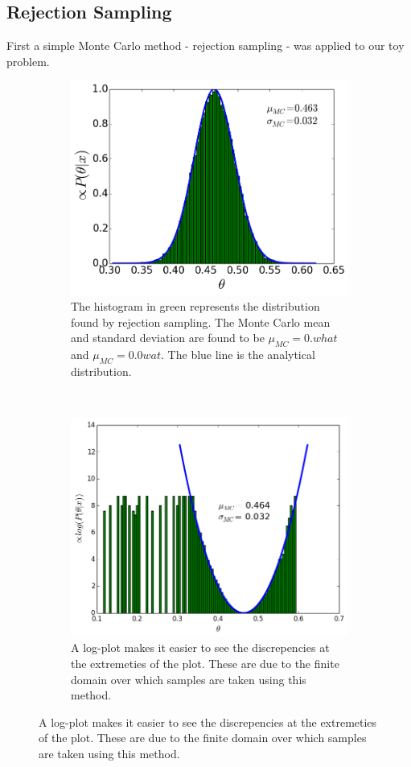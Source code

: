 \documentclass[a4paper,11pt,twoside]{article}
\begin{document}
\subsection{Rejection Sampling} 
First a simple Monte Carlo method - rejection sampling - was applied to our toy
problem.
\begin{figure}[ht]
	\centering
	\begin{subfigure}[t]{0.4\textwidth}
		\centering
		\includegraphics[width=\textwidth]{rejection.png}
		\caption{The histogram in green represents the distribution
			found by rejection sampling. The Monte Carlo mean and standard
			deviation are found to be $\mu_{MC} = 0.what$ and $\mu_{MC} = 0.0wat$.
			The blue line is the analytical distribution.}
		\label{fig:rejection}
	\end{subfigure}
	~
	\begin{subfigure}[t]{0.4\textwidth}
		\centering
		\includegraphics[width=\textwidth]{recentlog.png}
		\caption{A log-plot makes it easier to see the discrepencies at
			the extremeties of the plot. These are due to the finite
		domain over which samples are taken using this method.}
		\label{fig:rejlog}
	\end{subfigure}
\end{figure}
\end{document}
